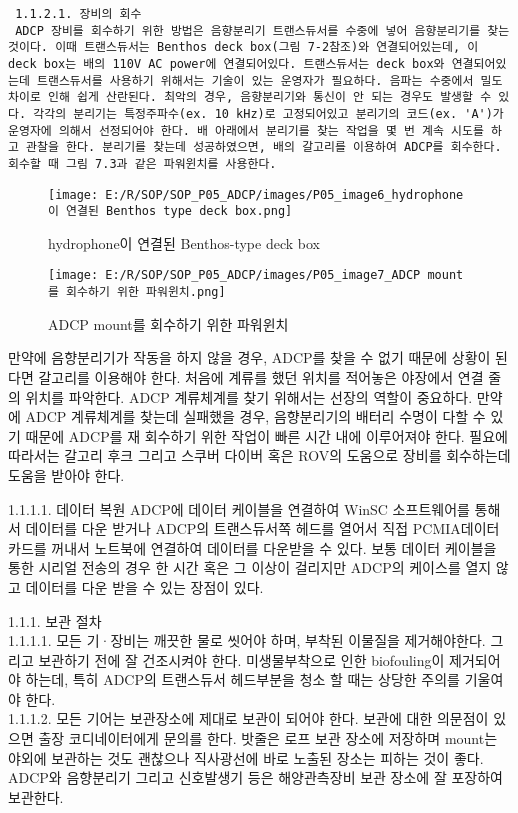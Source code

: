 \documentclass[
]{book}
\begin{document}
\begin{verbatim}
 1.1.2.1. 장비의 회수
 ADCP 장비를 회수하기 위한 방법은 음향분리기 트랜스듀서를 수중에 넣어 음향분리기를 찾는 것이다. 이때 트랜스듀서는 Benthos deck box(그림 7-2참조)와 연결되어있는데, 이 deck box는 배의 110V AC power에 연결되어있다. 트랜스듀서는 deck box와 연결되어있는데 트랜스듀서를 사용하기 위해서는 기술이 있는 운영자가 필요하다. 음파는 수중에서 밀도차이로 인해 쉽게 산란된다. 최악의 경우, 음향분리기와 통신이 안 되는 경우도 발생할 수 있다. 각각의 분리기는 특정주파수(ex. 10 kHz)로 고정되어있고 분리기의 코드(ex. 'A')가 운영자에 의해서 선정되어야 한다. 배 아래에서 분리기를 찾는 작업을 몇 번 계속 시도를 하고 관찰을 한다. 분리기를 찾는데 성공하였으면, 배의 갈고리를 이용하여 ADCP를 회수한다. 회수할 때 그림 7.3과 같은 파워윈치를 사용한다.   
\end{verbatim}

\begin{figure}
\centering
\texttt{[image: E:/R/SOP/SOP\_P05\_ADCP/images/P05\_image6\_hydrophone이 연결된 Benthos type deck box.png]}
\caption{hydrophone이 연결된 Benthos-type deck box}
\end{figure}

\begin{figure}
\centering
\texttt{[image: E:/R/SOP/SOP\_P05\_ADCP/images/P05\_image7\_ADCP mount를 회수하기 위한 파워윈치.png]}
\caption{ADCP mount를 회수하기 위한 파워윈치}
\end{figure}

만약에 음향분리기가 작동을 하지 않을 경우, ADCP를 찾을 수 없기 때문에 상황이 된다면 갈고리를 이용해야 한다. 처음에 계류를 했던 위치를 적어놓은 야장에서 연결 줄의 위치를 파악한다. ADCP 계류체계를 찾기 위해서는 선장의 역할이 중요하다. 만약에 ADCP 계류체계를 찾는데 실패했을 경우, 음향분리기의 배터리 수명이 다할 수 있기 때문에 ADCP를 재 회수하기 위한 작업이 빠른 시간 내에 이루어져야 한다. 필요에 따라서는 갈고리 후크 그리고 스쿠버 다이버 혹은 ROV의 도움으로 장비를 회수하는데 도움을 받아야 한다.

1.1.1.1. 데이터 복원
ADCP에 데이터 케이블을 연결하여 WinSC 소프트웨어를 통해서 데이터를 다운 받거나 ADCP의 트랜스듀서쪽 헤드를 열어서 직접 PCMIA데이터 카드를 꺼내서 노트북에 연결하여 데이터를 다운받을 수 있다. 보통 데이터 케이블을 통한 시리얼 전송의 경우 한 시간 혹은 그 이상이 걸리지만 ADCP의 케이스를 열지 않고 데이터를 다운 받을 수 있는 장점이 있다.

1.1.1. 보관 절차\\
1.1.1.1. 모든 기·장비는 깨끗한 물로 씻어야 하며, 부착된 이물질을 제거해야한다. 그리고 보관하기 전에 잘 건조시켜야 한다. 미생물부착으로 인한 biofouling이 제거되어야 하는데, 특히 ADCP의 트랜스듀서 헤드부분을 청소 할 때는 상당한 주의를 기울여야 한다.\\
1.1.1.2. 모든 기어는 보관장소에 제대로 보관이 되어야 한다. 보관에 대한 의문점이 있으면 출장 코디네이터에게 문의를 한다. 밧줄은 로프 보관 장소에 저장하며 mount는 야외에 보관하는 것도 괜찮으나 직사광선에 바로 노출된 장소는 피하는 것이 좋다. ADCP와 음향분리기 그리고 신호발생기 등은 해양관측장비 보관 장소에 잘 포장하여 보관한다.
\end{document}
